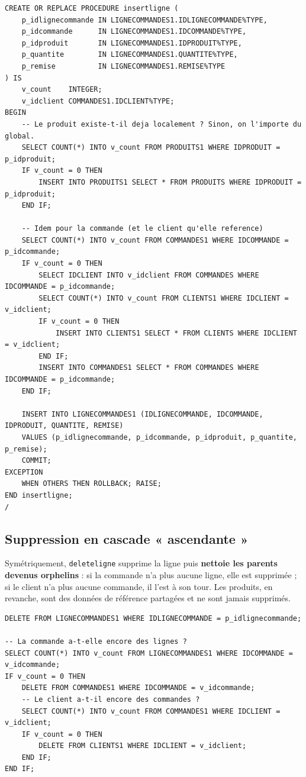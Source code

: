 \documentclass[11pt,a4paper]{article}
\begin{document}
\begin{lstlisting}[style=sql,caption={Insertion avec rapatriement automatique des parents (extrait, site~1).},label={lst:insert}]
CREATE OR REPLACE PROCEDURE insertligne (
    p_idlignecommande IN LIGNECOMMANDES1.IDLIGNECOMMANDE%TYPE,
    p_idcommande      IN LIGNECOMMANDES1.IDCOMMANDE%TYPE,
    p_idproduit       IN LIGNECOMMANDES1.IDPRODUIT%TYPE,
    p_quantite        IN LIGNECOMMANDES1.QUANTITE%TYPE,
    p_remise          IN LIGNECOMMANDES1.REMISE%TYPE
) IS
    v_count    INTEGER;
    v_idclient COMMANDES1.IDCLIENT%TYPE;
BEGIN
    -- Le produit existe-t-il deja localement ? Sinon, on l'importe du global.
    SELECT COUNT(*) INTO v_count FROM PRODUITS1 WHERE IDPRODUIT = p_idproduit;
    IF v_count = 0 THEN
        INSERT INTO PRODUITS1 SELECT * FROM PRODUITS WHERE IDPRODUIT = p_idproduit;
    END IF;

    -- Idem pour la commande (et le client qu'elle reference)
    SELECT COUNT(*) INTO v_count FROM COMMANDES1 WHERE IDCOMMANDE = p_idcommande;
    IF v_count = 0 THEN
        SELECT IDCLIENT INTO v_idclient FROM COMMANDES WHERE IDCOMMANDE = p_idcommande;
        SELECT COUNT(*) INTO v_count FROM CLIENTS1 WHERE IDCLIENT = v_idclient;
        IF v_count = 0 THEN
            INSERT INTO CLIENTS1 SELECT * FROM CLIENTS WHERE IDCLIENT = v_idclient;
        END IF;
        INSERT INTO COMMANDES1 SELECT * FROM COMMANDES WHERE IDCOMMANDE = p_idcommande;
    END IF;

    INSERT INTO LIGNECOMMANDES1 (IDLIGNECOMMANDE, IDCOMMANDE, IDPRODUIT, QUANTITE, REMISE)
    VALUES (p_idlignecommande, p_idcommande, p_idproduit, p_quantite, p_remise);
    COMMIT;
EXCEPTION
    WHEN OTHERS THEN ROLLBACK; RAISE;
END insertligne;
/
\end{lstlisting}

\subsection{Suppression en cascade « ascendante »}

Symétriquement, \texttt{deleteligne} supprime la ligne puis \textbf{nettoie les
parents devenus orphelins} : si la commande n'a plus aucune ligne, elle est
supprimée ; si le client n'a plus aucune commande, il l'est à son tour. Les
produits, en revanche, sont des données de référence partagées et ne sont
jamais supprimés.

\begin{lstlisting}[style=sql,caption={Suppression et nettoyage des parents orphelins (extrait).},label={lst:delete}]
DELETE FROM LIGNECOMMANDES1 WHERE IDLIGNECOMMANDE = p_idlignecommande;

-- La commande a-t-elle encore des lignes ?
SELECT COUNT(*) INTO v_count FROM LIGNECOMMANDES1 WHERE IDCOMMANDE = v_idcommande;
IF v_count = 0 THEN
    DELETE FROM COMMANDES1 WHERE IDCOMMANDE = v_idcommande;
    -- Le client a-t-il encore des commandes ?
    SELECT COUNT(*) INTO v_count FROM COMMANDES1 WHERE IDCLIENT = v_idclient;
    IF v_count = 0 THEN
        DELETE FROM CLIENTS1 WHERE IDCLIENT = v_idclient;
    END IF;
END IF;
\end{lstlisting}
\end{document}
